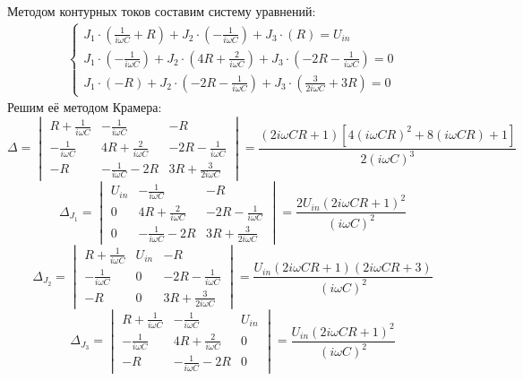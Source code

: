 Методом контурных токов составим систему уравнений:
\begin{gather}
	\left\{
	\begin{aligned}
		J_1\cdot\left(\frac{1}{i\omega C}+R\right)+J_2\cdot\left( -\frac{1}{i\omega C} \right)+J_3\cdot\left(R \right)=U_{in}                  \\
		J_1\cdot\left(-\frac{1}{i\omega C}\right)+J_2\cdot\left(4R+\frac{2}{i\omega C} \right)+J_3\cdot\left(-2R-\frac{1}{i\omega C} \right)=0 \\
		J_1\cdot\left(-R\right)+J_2\cdot\left( -2R-\frac{1}{i\omega C} \right)+J_3\cdot\left(\frac{3}{2i\omega C}+3R \right)=0
	\end{aligned}
	\right.
\end{gather}
Решим её методом Крамера:
\begin{equation}
	\Delta =\begin{vmatrix}
		R+\frac{1}{i\omega C} & -\frac{1}{i\omega C}    & -R                       \\
		-\frac{1}{i\omega C}  & 4R+\frac{2}{i\omega C}  & -2R-\frac{1}{i\omega C}  \\
		-R                    & -\frac{1}{i\omega C}-2R & 3R+\frac{3}{2i\omega C}\
	\end{vmatrix}=
	\frac{(2i\omega CR+1)[4(i\omega CR)^2+8(i\omega CR)+1]}{2(i\omega C)^3}
\end{equation}
\begin{equation}
	\Delta_{J_1} =\begin{vmatrix}
		U_{in} & -\frac{1}{i\omega C}    & -R                       \\
		0      & 4R+\frac{2}{i\omega C}  & -2R-\frac{1}{i\omega C}  \\
		0      & -\frac{1}{i\omega C}-2R & 3R+\frac{3}{2i\omega C}\
	\end{vmatrix}=
	\frac{2U_{in}(2i\omega CR+1)^2}{(i\omega C)^2}
\end{equation}
\begin{equation}
	\Delta_{J_2} =\begin{vmatrix}
		R+\frac{1}{i\omega C} & U_{in} & -R                       \\
		-\frac{1}{i\omega C}  & 0      & -2R-\frac{1}{i\omega C}  \\
		-R                    & 0      & 3R+\frac{3}{2i\omega C}\
	\end{vmatrix}=
	\frac{U_{in}(2i\omega CR+1)(2i\omega CR+3)}{(i\omega C)^2}
\end{equation}
\begin{equation}
	\Delta_{J_3} =\begin{vmatrix}
		R+\frac{1}{i\omega C} & -\frac{1}{i\omega C}    & U_{in} \\
		-\frac{1}{i\omega C}  & 4R+\frac{2}{i\omega C}  & 0      \\
		-R                    & -\frac{1}{i\omega C}-2R & 0\
	\end{vmatrix}=
	\frac{U_{in}(2i\omega CR+1)^2}{(i\omega C)^2}
\end{equation}
